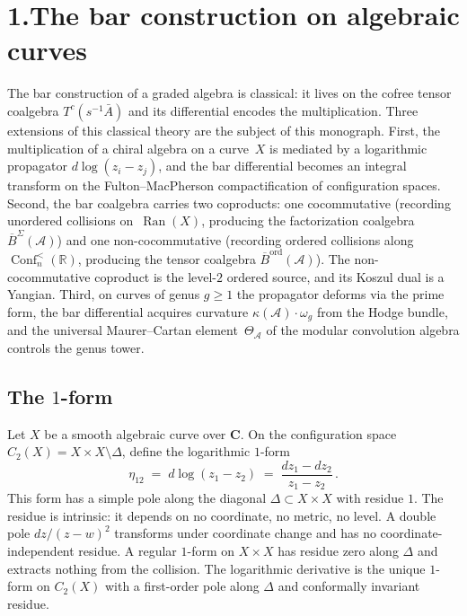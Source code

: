 \providecommand{\cA}{\mathcal{A}}
\providecommand{\barB}{\overline{B}}
\providecommand{\gAmod}{\mathfrak{g}_{\cA}^{\mathrm{mod}}}
\providecommand{\MC}{\text{MC}}

\section*{1.\quad The bar construction on algebraic curves}

\medskip

\noindent
The bar construction of a graded algebra is classical: it lives on the
cofree tensor coalgebra $T^c(s^{-1}\bar A)$ and its differential
encodes the multiplication. Three extensions of this classical theory
are the subject of this monograph. First, the multiplication of a
chiral algebra on a curve~$X$ is mediated by a logarithmic propagator
$d\log(z_i - z_j)$, and the bar differential becomes an integral
transform on the Fulton--MacPherson compactification of configuration
spaces. Second, the bar coalgebra carries two coproducts: one
cocommutative (recording unordered collisions on~$\operatorname{Ran}(X)$,
producing the factorization coalgebra $\barB^{\Sigma}(\cA)$) and one
non-cocommutative (recording ordered collisions along
$\operatorname{Conf}_n^{<}(\mathbb R)$, producing the tensor coalgebra
$\barB^{\mathrm{ord}}(\cA)$). The non-cocommutative coproduct is the
level-$2$ ordered source, and its Koszul dual is a Yangian. Third, on curves
of genus $g \ge 1$ the propagator deforms via the prime form, the bar
differential acquires curvature $\kappa(\cA)\cdot\omega_g$ from the
Hodge bundle, and the universal Maurer--Cartan element~$\Theta_{\cA}$
of the modular convolution algebra controls the genus tower.

\subsection*{The $1$-form}

\noindent
Let $X$ be a smooth algebraic curve over $\mathbf{C}$. On the configuration space
$C_2(X) = X \times X \setminus \Delta$, define the logarithmic $1$-form
\begin{equation}\label{eq:pf1-eta}
\eta_{12} \;=\; d\log(z_1 - z_2) \;=\; \frac{dz_1 - dz_2}{z_1 - z_2}\,.
\end{equation}
This form has a simple pole along the diagonal $\Delta \subset X \times X$
with residue $1$. The residue is intrinsic: it depends on no coordinate, no
metric, no level. A double pole $dz/(z-w)^2$ transforms under coordinate
change and has no coordinate-independent residue. A regular $1$-form on
$X \times X$ has residue zero along $\Delta$ and extracts nothing from the
collision. The logarithmic derivative is the unique $1$-form on $C_2(X)$
with a first-order pole along $\Delta$ and conformally invariant residue.

